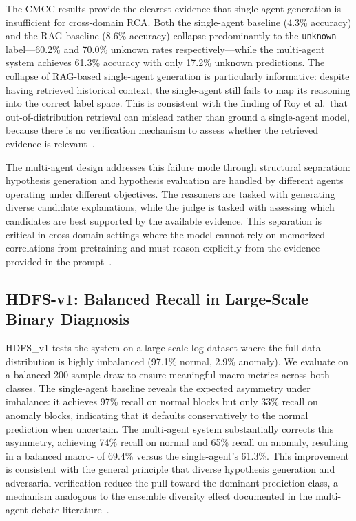 The CMCC results provide the clearest evidence that single-agent generation is insufficient for
cross-domain RCA. Both the single-agent baseline (4.3\% accuracy) and the RAG baseline (8.6\%
accuracy) collapse predominantly to the \texttt{unknown} label---60.2\% and 70.0\% unknown rates
respectively---while the multi-agent system achieves 61.3\% accuracy with only 17.2\% unknown
predictions. The collapse of RAG-based single-agent generation is particularly informative: despite
having retrieved historical context, the single-agent still fails to map its reasoning into the
correct label space. This is consistent with the finding of Roy et al.\ that out-of-distribution
retrieval can mislead rather than ground a single-agent model, because there is no verification
mechanism to assess whether the retrieved evidence is relevant~\cite{roy2024llmagentRCA}.

The multi-agent design addresses this failure mode through structural separation: hypothesis
generation and hypothesis evaluation are handled by different agents operating under different
objectives. The reasoners are tasked with generating diverse candidate explanations, while the
judge is tasked with assessing which candidates are best supported by the available evidence. This
separation is critical in cross-domain settings where the model cannot rely on memorized
correlations from pretraining and must reason explicitly from the evidence provided in the
prompt~\cite{ahmed2023rcarecommend}.

\subsection{HDFS-v1: Balanced Recall in Large-Scale Binary Diagnosis}

HDFS\_v1 tests the system on a large-scale log dataset where the full data distribution is highly
imbalanced (97.1\% normal, 2.9\% anomaly). We evaluate on a balanced 200-sample draw to ensure
meaningful macro metrics across both classes. The single-agent baseline reveals the expected
asymmetry under imbalance: it achieves 97\% recall on normal blocks but only 33\% recall on
anomaly blocks, indicating that it defaults conservatively to the normal prediction when uncertain.
The multi-agent system substantially corrects this asymmetry, achieving 74\% recall on normal and
65\% recall on anomaly, resulting in a balanced macro-\fone{} of 69.4\% versus the single-agent's
61.3\%. This improvement is consistent with the general principle that diverse hypothesis
generation and adversarial verification reduce the pull toward the dominant prediction class,
a mechanism analogous to the ensemble diversity effect documented in the multi-agent debate
literature~\cite{du2023improvingfactualityreasoninglanguage}.

